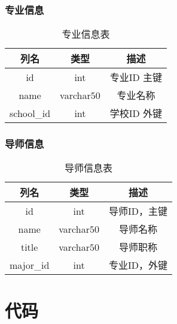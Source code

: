 \documentclass[UTF8]{ctexart}
\begin{document}
    \subsubsection{专业信息}
    \begin{table}[h!]
        \centering
        \caption{专业信息表}
        \begin{tabular}{ccc}
        \hline
        列名 & 类型 & 描述 \\
        \hline
        id & int & 专业ID 主键 \\
        name & varchar\(50\) & 专业名称 \\
        school\_id & int & 学校ID 外键 \\
        \hline
        \end{tabular}
        \label{tab:major_info}
    \end{table}
    \subsubsection{导师信息}
    \begin{table}[h!]
        \centering
        \caption{导师信息表}
        \begin{tabular}{ccc}
        \hline
        列名 & 类型 & 描述 \\
        \hline
        id & int & 导师ID，主键 \\
        name & varchar\(50\) & 导师名称 \\
        title & varchar\(50\) & 导师职称 \\
        major\_id & int & 专业ID，外键 \\
        \hline
        \end{tabular}
        \label{tab:mentor_info}
    \end{table}
    
    \section{代码}
\end{document}
